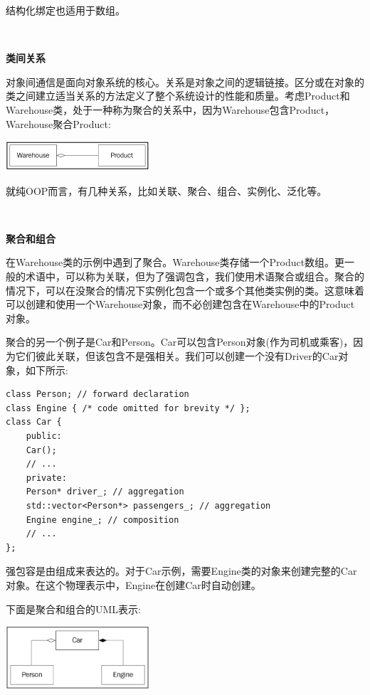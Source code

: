 结构化绑定也适用于数组。 \par

\noindent\textbf{}\ \par
\textbf{类间关系} \ \par
对象间通信是面向对象系统的核心。关系是对象之间的逻辑链接。区分或在对象的类之间建立适当关系的方法定义了整个系统设计的性能和质量。考虑Product和Warehouse类，处于一种称为聚合的关系中，因为Warehouse包含Product，Warehouse聚合Product:\par

\begin{center}
	\includegraphics[width=0.4\textwidth]{content/Section-1/Chapter-3/11}
\end{center}

就纯OOP而言，有几种关系，比如关联、聚合、组合、实例化、泛化等。 \par

\noindent\textbf{}\ \par
\textbf{聚合和组合} \ \par
在Warehouse类的示例中遇到了聚合。Warehouse类存储一个Product数组。更一般的术语中，可以称为关联，但为了强调包含，我们使用术语聚合或组合。聚合的情况下，可以在没聚合的情况下实例化包含一个或多个其他类实例的类。这意味着可以创建和使用一个Warehouse对象，而不必创建包含在Warehouse中的Product对象。 \par
聚合的另一个例子是Car和Person。Car可以包含Person对象(作为司机或乘客)，因为它们彼此关联，但该包含不是强相关。我们可以创建一个没有Driver的Car对象，如下所示:\par

\begin{lstlisting}[caption={}]
class Person; // forward declaration
class Engine { /* code omitted for brevity */ };
class Car {
	public:
	Car();
	// ...
	private:
	Person* driver_; // aggregation
	std::vector<Person*> passengers_; // aggregation
	Engine engine_; // composition
	// ...
};
\end{lstlisting}

强包容是由组成来表达的。对于Car示例，需要Engine类的对象来创建完整的Car对象。在这个物理表示中，Engine在创建Car时自动创建。 \par
下面是聚合和组合的UML表示: \par

\begin{center}
	\includegraphics[width=0.4\textwidth]{content/Section-1/Chapter-3/12}
\end{center}

